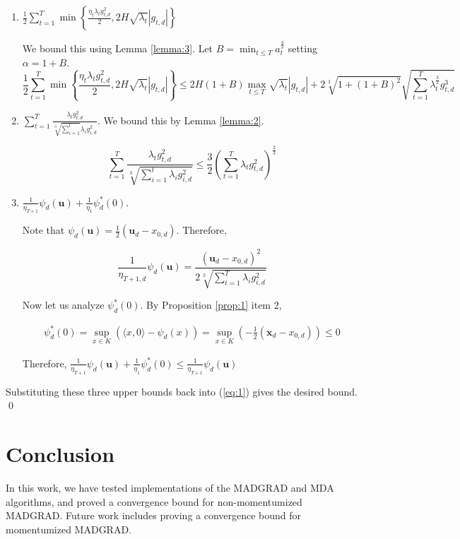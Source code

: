 \documentclass{article}
\newcommand{\bx}{\mathbf{x}}
\newcommand{\bu}{\mathbf{u}}
\begin{document}
\begin{enumerate}
\item $\frac{1}{2}\sum\limits_{t=1}^T \min \left\{\frac{\eta_t \lambda_t g_{t,d}^2}{2}, 2H\sqrt{\lambda_t}|g_{t,d}|\right\}$

  We bound this using Lemma \ref{lemma:3}. Let $B = \min_{t\leq T}a_{t}^\frac{4}{3}$ setting $\alpha = 1+B$.
  \[
    \frac{1}{2}\sum\limits_{t=1}^T \min \left\{\frac{\eta_t \lambda_t g_{t,d}^2}{2}, 2H\sqrt{\lambda_t}|g_{t,d}|\right\}
    \leq 2H(1+B)\max_{t\leq T}\sqrt{\lambda_t}|g_{t,d}| +
    2\sqrt[3]{1 + (1+B)^2}\sqrt{\sum\limits_{t=1}^T \lambda_{t}^\frac{3}{2} g_{t,d}^3}
  \]
\item $\sum\limits_{t=1}^T \frac{\lambda_t g_{t,d}^2}{\sqrt[3]{\sum\limits_{i=1}^t}\lambda_i g_{i,d}^2}$. We bound this
  by Lemma \ref{lemma:2}.

  \[
    \sum\limits_{t=1}^T \frac{\lambda_t g_{t,d}^2}{\sqrt[3]{\sum\limits_{i=1}^t\lambda_i g_{i,d}^2}} \leq \frac{3}{2}
    \left(\sum\limits_{t=1}^T \lambda_t g_{t,d}^2\right)^\frac{2}{3}
  \]
\item $\frac{1}{\eta_{T+1}}\psi_{d}(\bu) + \frac{1}{\eta_1}\psi_{d}^*(0)$.

  Note that $\psi_d(\bu) = \frac{1}{2}(\bu_d - x_{0,d})$. Therefore,

  \[
    \frac{1}{\eta_{T+1,d}}\psi_d(\bu) = \frac{(\bu_d - x_{0,d})^2}{2 \sqrt[3]{\sum\limits_{t=1}^T \lambda_i g_{i,d}^2}}
  \]

  Now let us analyze $\psi_d^*(0)$. By Proposition \ref{prop:1} item 2,

  \begin{align*}
    \psi_d^*(0) = \sup\limits_{x \in K}(\langle x , 0 \rangle - \psi_d(x)) = \sup_{x \in K}(-\frac{1}{2}(\bx_d -
    x_{0,d})) \leq 0
  \end{align*}

  Therefore, $\frac{1}{\eta_{T+1}}\psi_{d}(\bu) + \frac{1}{\eta_1}\psi_{d}^*(0) \leq \frac{1}{\eta_{T+1}}\psi_{d}(\bu)$
\end{enumerate}

Substituting these three upper bounds back into (\ref{eq:1}) gives the desired bound. \\
\qed

\section{Conclusion}

In this work, we have tested implementations of the MADGRAD and MDA algorithms, and proved a convergence bound for
non-momentumized MADGRAD. Future work includes proving a convergence bound for momentumized MADGRAD.
\end{document}
